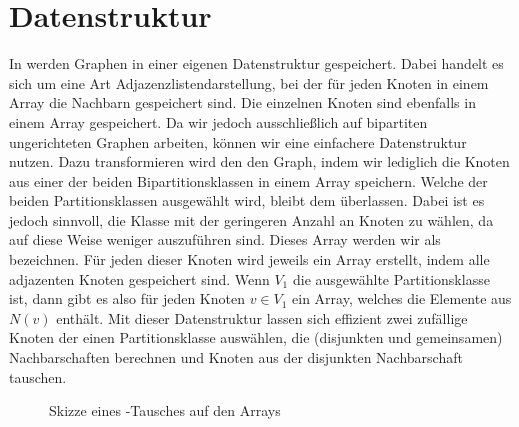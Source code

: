 \section{Datenstruktur}
\label{sec:datenstruktur}
In \nk werden Graphen in einer eigenen Datenstruktur gespeichert.
Dabei handelt es sich um eine Art Adjazenzlistendarstellung, bei der für jeden Knoten 
in einem Array die Nachbarn gespeichert sind. Die einzelnen Knoten sind ebenfalls in
einem Array gespeichert. Da wir jedoch ausschließlich auf bipartiten ungerichteten Graphen
arbeiten, können wir eine einfachere Datenstruktur nutzen. Dazu transformieren wird den
den Graph, indem wir lediglich
die Knoten aus einer der beiden Bipartitionsklassen 
in einem Array speichern.
Welche der beiden Partitionsklassen ausgewählt wird, bleibt dem  überlassen.
Dabei ist es jedoch sinnvoll, die Klasse mit der geringeren Anzahl an Knoten zu wählen, da auf diese
Weise weniger  auszuführen sind.
 Dieses Array werden wir als  \red{\fett{\partvek}} bezeichnen. 
Für jeden dieser Knoten wird jeweils ein Array erstellt, indem alle adjazenten Knoten gespeichert sind.
Wenn $V_{1}$ die ausgewählte Partitionsklasse ist, dann gibt es also für jeden Knoten $v\in V_{1}$
ein Array, welches die Elemente aus $N(v)$ enthält.
Mit dieser Datenstruktur lassen sich effizient zwei zufällige Knoten der einen Partitionsklasse
auswählen, die (disjunkten und gemeinsamen) Nachbarschaften berechnen und Knoten aus der
disjunkten Nachbarschaft tauschen.
%
%
%
%
%
%
\begin{figure}
\centering
  \caption{Skizze eines \cb-Tausches auf den Arrays}
  \label{fig:curveball_trade_vector}
  
\end{figure}
